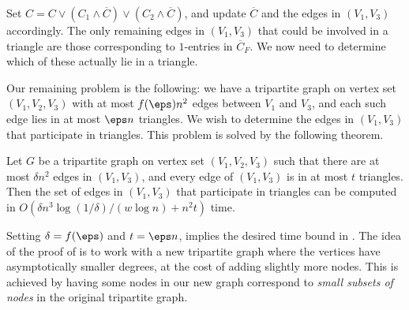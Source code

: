 Set $C = C \vee (C_1 \wedge \overline{C}) \vee (C_2 \wedge \overline{C})$, and update $\overline{C}$ and the edges in $(V_1,V_3)$ accordingly. The only remaining edges in $(V_1,V_3)$ that could be involved in a triangle are those corresponding to $1$-entries in ${\overline{C}}_F$. We now need to determine which of these actually lie in a triangle. 

Our remaining problem is the following: we have a tripartite graph on vertex set $(V_1,V_2,V_3)$ with at most $f(\eps) n^2$ edges between $V_1$ and $V_3$, and each such edge lies in at most  $\eps n$ triangles. We wish to determine the edges in $(V_1,V_3)$ that participate in triangles. This problem is solved by the following theorem.

\begin{theorem}\label{sparseedgelisting} Let $G$ be a tripartite graph on vertex set $(V_1,V_2,V_3)$ such that there are at most $\delta n^2$ edges in $(V_1,V_3)$, and every edge of $(V_1,V_3)$ is in at most $t$ triangles. Then the set of edges in $(V_1,V_3)$ that participate in triangles can be computed in $O(\delta n^3 \log(1/\delta)/(w \log n) + n^2 t)$ time. \end{theorem}

Setting $\delta = f(\eps)$ and $t = \eps n$,  implies the desired time bound in . The idea of the proof of  is to work with a new tripartite graph where the vertices have asymptotically smaller degrees, at the cost of adding slightly more nodes. This is achieved by having some nodes in our new graph correspond to \emph{small subsets of nodes} in the original tripartite graph.

